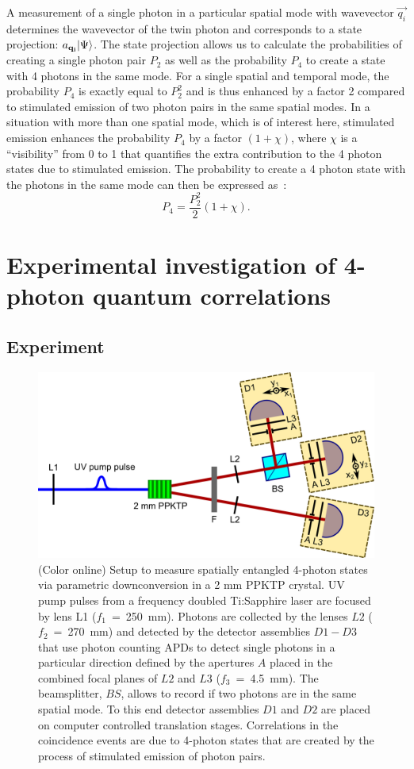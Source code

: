 A measurement of a single photon in a particular spatial mode with wavevector $\vec{q_i}$ determines the wavevector of the twin photon and corresponds to a state projection: $a_{ \mathbf{ q_i } }\vert \Psi \rangle$. The state projection allows us to calculate the probabilities of creating a single photon pair $P_2$ as well as the probability $P_4$ to create a state with 4 photons in the same mode. For a single spatial and temporal mode, the probability $P_4$ is exactly equal to $P_2^2$ and is thus enhanced by a factor 2 compared to stimulated emission of two photon pairs in the same spatial modes. In a situation with more than one spatial mode, which is of interest here, stimulated emission enhances the probability $P_4$ by a factor $(1+\chi)$, where $\chi$ is a ``visibility'' from 0 to 1 that quantifies the extra contribution to the 4 photon states due to stimulated emission. The probability to create a 4 photon state with the photons in the same mode can then be expressed as~\cite{Riedmatten2004}:
\begin{equation}
P_4 = \frac{P_2^2}{2} (1+\chi).
\end{equation}

\section{Experimental investigation of 4-photon quantum correlations}

\subsection{Experiment}

\begin{figure}[tbp]
\centering \includegraphics[width=120mm]{Fig1.png}
\caption{(Color online) Setup to measure spatially entangled 4-photon states via parametric downconversion in a 2 mm PPKTP crystal. UV pump pulses from a frequency doubled Ti:Sapphire laser are focused by lens L1 ($f_1$~=~250~mm). Photons are collected by the lenses $L2$ ($f_2$~=~270~mm) and detected by the detector assemblies $D1-D3$ that use photon counting APDs to detect single photons in a particular direction defined by the apertures $A$ placed in the combined focal planes of $L2$ and $L3$ ($f_3$~=~4.5~mm). The beamsplitter, $BS$, allows to record if two photons are in the same spatial mode. To this end detector assemblies $D1$ and $D2$ are placed on computer controlled translation stages. Correlations in the coincidence events are due to 4-photon states that are created by the process of stimulated emission of photon pairs.} \label{Fig:setup}
\end{figure}

